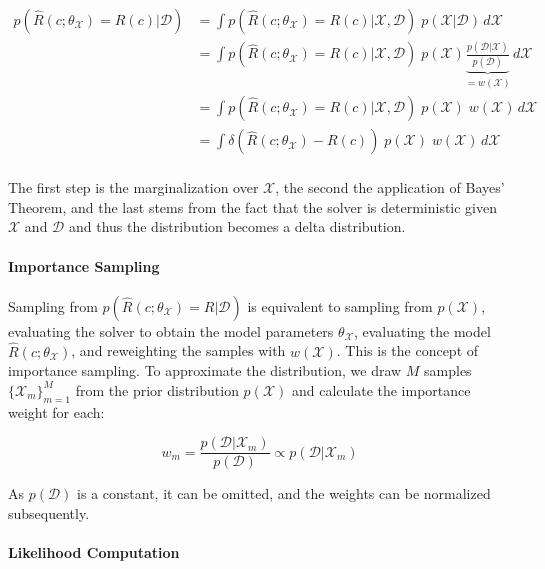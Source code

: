\begin{align*}
p(\hat{R}(c; \theta_{\mathcal{X}}) = R(c)| \mathcal{D}) &= \int p(\hat{R}(c; \theta_{\mathcal{X}}) = R(c) | \mathcal{X}, \mathcal{D})\; p(\mathcal{X} | \mathcal{D}) \, d\mathcal{X} \\
                                          &= \int p(\hat{R}(c; \theta_{\mathcal{X}}) = R(c) | \mathcal{X}, \mathcal{D})\; p(\mathcal{X}) \underbrace{\frac{p(\mathcal{D} | \mathcal{X}) }{p(\mathcal{D})}}_{= w(\mathcal{X})} \, d\mathcal{X} \\
                                          &= \int p(\hat{R}(c; \theta_{\mathcal{X}}) = R(c) | \mathcal{X}, \mathcal{D})\; p(\mathcal{X})\; w(\mathcal{X}) \, d\mathcal{X} \\
                                          &= \int \delta(\hat{R}(c; \theta_{\mathcal{X}}) - R(c))\; p(\mathcal{X})\; w(\mathcal{X}) \, d\mathcal{X} \\
\end{align*}

The first step is the marginalization over $\mathcal{X}$, the second the application of Bayes' Theorem, and the last stems from the fact that the solver is deterministic given $\mathcal{X}$ and $\mathcal{D}$ and thus the distribution becomes a delta distribution.


\paragraph{Importance Sampling}

Sampling from $p(\hat{R}(c; \theta_{\mathcal{X}}) = R| \mathcal{D})$ is equivalent to sampling from $p(\mathcal{X})$, evaluating the solver to obtain the model parameters $\theta_{\mathcal{X}}$, evaluating the model $\hat{R}(c; \theta_{\mathcal{X}})$, and reweighting the samples with $w(\mathcal{X})$. This is the concept of importance sampling. To approximate the distribution, we draw $M$ samples $\{\mathcal{X}_m\}_{m=1}^M$ from the prior distribution $p(\mathcal{X})$ and calculate the importance weight for each:

\begin{equation*}
w_m = \frac{p(\mathcal{D} | \mathcal{X}_m)}{p(\mathcal{D})} \propto p(\mathcal{D} | \mathcal{X}_m)
\end{equation*}

As $p(\mathcal{D})$ is a constant, it can be omitted, and the weights can be normalized subsequently.


\paragraph{Likelihood Computation}

